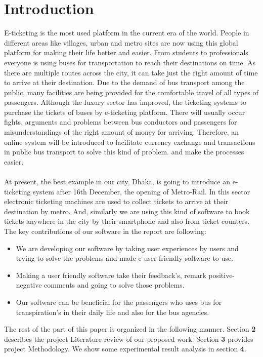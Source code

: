 \documentclass[runningheads]{llncs}
\begin{document}
\section{Introduction}
E-ticketing is the most used platform in the current era of the world. People in different areas like villages, urban and metro sites are now using this global platform for making their life better and easier. From students to professionals everyone is using buses for transportation to reach their destinations on time. As there are multiple routes across the city, it can take just the right amount of time to arrive at their destination. Due to the demand of bus transport among the public, many facilities are being provided for the comfortable travel of all types of passengers. Although the luxury sector has improved, the ticketing systems to purchase the tickets of buses by  e-ticketing platform. There will usually occur fights, arguments and problems between bus conductors and passengers for misunderstandings of the right amount of money for arriving. Therefore, an online system will be introduced to facilitate currency exchange and transactions in public bus transport to solve this kind of problem. and make the processes easier.
\\\\
At present, the best example in our city, Dhaka, is going to introduce an e-ticketing system after 16th December, the opening of Metro-Rail. In this sector electronic ticketing machines are used to collect tickets to arrive at their destination by metro. And, similarly we are using this kind of software to book tickets anywhere in the city by their smartphone and also from ticket counters.\\
The key contributions of our software in the report are following: 
\begin{itemize}
    \item We are developing our software by taking user experiences by users and trying to solve the problems and made e user friendly software to use.
    \item Making a user friendly software take their feedback's, remark positive-negative comments and going to solve those problems.
    \item Our software can be beneficial for the passengers who uses bus for transpiration's in their daily life and also for the bus agencies.
\end{itemize}

The rest of the part of this paper is organized in the following manner. Section \textbf{2} describes the project Literature review of our proposed work. Section \textbf{3} provides project Methodology. We show some experimental result analysis in section \textbf{4}.
\end{document}
